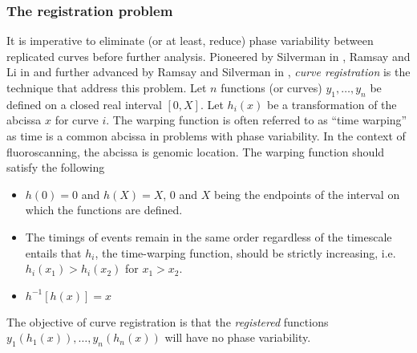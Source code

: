 \subsubsection*{The registration problem}
It is imperative to eliminate (or at least, reduce) phase variability between replicated curves before further analysis. Pioneered by Silverman in \cite{Silverman_1995_JRSSB}, Ramsay and Li in \cite{Ramsay_Li_1998_JRSSB} and further advanced by Ramsay and Silverman in \cite{Ramsay_2006_Functional}, {\emph{curve registration}} is the technique that address this problem. Let $n$ functions (or curves) $y_1, \dots, y_n$ be defined on a closed real interval $[0, X]$. Let $h_i(x)$ be a transformation of the abcissa $x$ for curve $i$. The warping function is often referred to as ``time warping'' as time is a common abcissa in problems with phase variability. In the context of fluoroscanning, the abcissa is genomic location. The warping function should satisfy the following
\begin{itemize}
\item $h(0) = 0$ and $h(X) = X$, $0$ and $X$ being the endpoints of the interval on which the functions are defined.
\item The timings of events remain in the same order regardless of the timescale entails that $h_i$, the time-warping function, should be strictly increasing, i.e. $h_i(x_1) > h_i(x_2)$ for $x_1 > x_2$. 
\item $h^{-1}[h(x)] = x$
\end{itemize}
The objective of curve registration is that the {\emph{registered}} functions $y_1(h_1(x)), \dots, y_n(h_n(x))$ will have no phase variability. 

